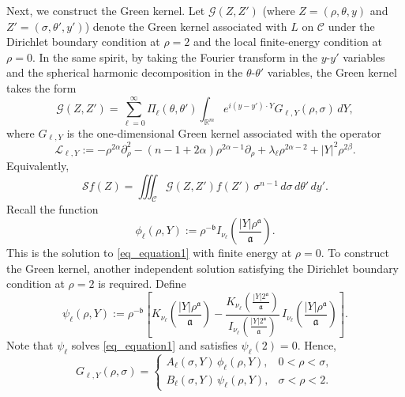 \documentclass[12pt]{amsart}
\begin{document}
Next, we construct the Green kernel. Let $\mathcal{G}(Z,Z')$ (where $Z = (\rho,\theta,y)$ and $Z' = (\sigma,\theta',y')$) denote the Green kernel associated with $L$ on $\mathcal{C}$ under the Dirichlet boundary condition at $\rho=2$ and the local finite-energy condition at $\rho=0$. In the same spirit, by taking the Fourier transform in the $y$-$y'$ variables and the spherical harmonic decomposition in the $\theta$-$\theta'$ variables, the Green kernel takes the form
\begin{equation}\label{eq_Green's_kernel}
    \mathcal{G}(Z,Z') = \sum_{\ell=0}^\infty \Pi_{\ell}(\theta, \theta') \int_{\mathbb{R}^m} e^{i(y-y') \cdot Y} G_{\ell, Y}(\rho, \sigma) \, dY,
\end{equation}
where $G_{\ell,Y}$ is the one-dimensional Green kernel associated with the operator
\begin{equation*}
    \mathcal{L}_{\ell,Y} := - \rho^{2\alpha} \partial_{\rho}^2 - (n-1+2\alpha) \rho^{2\alpha-1} \partial_\rho + \lambda_\ell \rho^{2\alpha-2} + |Y|^2 \rho^{2\beta}.
\end{equation*}
Equivalently,
\begin{equation}
    \mathcal{S}f(Z) = \iiint_{\mathcal{C}} \mathcal{G}(Z,Z') f(Z') \, \sigma^{n-1} \, d\sigma \, d\theta' \, dy'.
\end{equation}
Recall the function
\begin{equation*}
    \phi_{\ell}(\rho,Y):= \rho^{-\mathfrak b} I_{\nu_\ell}\!\left( \frac{|Y| \rho^{\mathfrak a}}{\mathfrak a} \right).
\end{equation*}
This is the solution to \eqref{eq_equation1} with finite energy at $\rho=0$. To construct the Green kernel, another independent solution satisfying the Dirichlet boundary condition at $\rho=2$ is required. Define
\begin{equation*}
    \psi_{\ell}(\rho, Y):= \rho^{-\mathfrak b} \left[ K_{\nu_\ell} \!\left( \frac{|Y| \rho^{\mathfrak a}}{\mathfrak a} \right) - \frac{K_{\nu_\ell} \!\left( \frac{|Y| 2^{\mathfrak a}}{\mathfrak a} \right)}{I_{\nu_\ell} \!\left( \frac{|Y| 2^{\mathfrak a}}{\mathfrak a} \right)} \, I_{\nu_\ell} \!\left( \frac{|Y| \rho^{\mathfrak a}}{\mathfrak a} \right) \right].
\end{equation*}
Note that $\psi_{\ell}$ solves \eqref{eq_equation1} and satisfies $\psi_{\ell}(2)=0$. Hence,
\begin{equation*}
    G_{\ell,Y}(\rho,\sigma) = \begin{cases}
        A_\ell(\sigma, Y) \, \phi_{\ell}(\rho, Y), & 0 < \rho < \sigma,\\[4pt]
        B_\ell(\sigma, Y) \, \psi_{\ell}(\rho, Y), & \sigma < \rho < 2.
    \end{cases}
\end{equation*}
\end{document}
